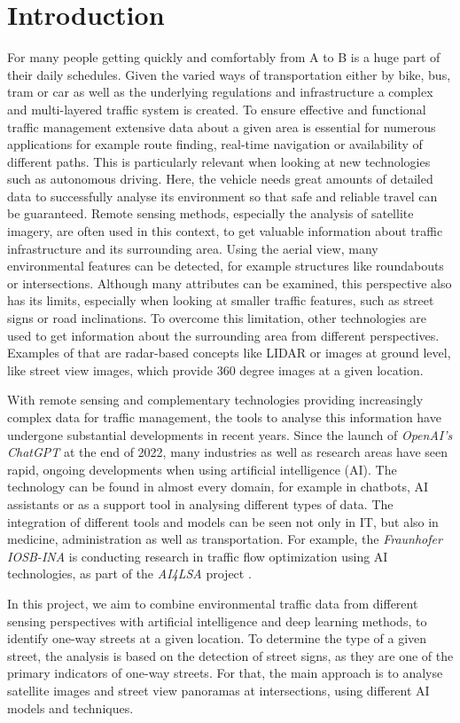 \section{Introduction}

For many people getting quickly and comfortably from A to B is a huge part of
their daily schedules.
Given the varied ways of transportation either by bike, bus, tram or car as
well as the underlying regulations and infrastructure a complex and multi-layered
traffic system is created.
To ensure effective and functional traffic management extensive data about a
given area is essential for numerous applications for example route finding,
real-time navigation or availability of different paths.
This is particularly relevant when looking at new technologies such as autonomous
driving.
Here, the vehicle needs great amounts of detailed data to successfully analyse
its environment so that safe and reliable travel can be guaranteed.
Remote sensing methods, especially the analysis of satellite imagery, are often
used in this context, to get valuable information about traffic infrastructure
and its surrounding area. Using the aerial view, many environmental features can
be detected, for example structures like roundabouts or intersections. Although
many attributes can be examined, this perspective also has its limits,
especially when looking at smaller traffic features, such as street signs or
road inclinations. To overcome this limitation, other technologies are used to
get information about the surrounding area from different perspectives.
Examples of that are radar-based concepts like LIDAR or images at ground level,
like street view images, which provide 360 degree images at a given location.

With remote sensing and complementary technologies providing increasingly
complex data for traffic management, the tools to analyse this information have
undergone substantial developments in recent years.
Since the launch of \textit{OpenAI’s ChatGPT} at the end of 2022, many
industries as well as research areas have seen rapid, ongoing developments when
using artificial intelligence (AI).
The technology can be found in almost every domain, for example in chatbots, AI
assistants or as a support tool in analysing different types of data.
The integration of different tools and models can be seen not only in IT, but
also in medicine, administration as well as transportation. For example, the
\textit{Fraunhofer IOSB-INA} is conducting research in traffic flow optimization using
AI technologies, as part of the \textit{AI4LSA} project \cite{FIOSBINA}.

In this project, we aim to combine environmental traffic data from different
sensing perspectives with artificial intelligence and deep learning methods,
to identify one-way streets at a given location. To determine the type of a
given street, the analysis is based on the detection of street signs, as they
are one of the primary indicators of one-way streets.
For that, the main approach is to analyse satellite images and street view
panoramas at intersections, using different AI models and techniques.


